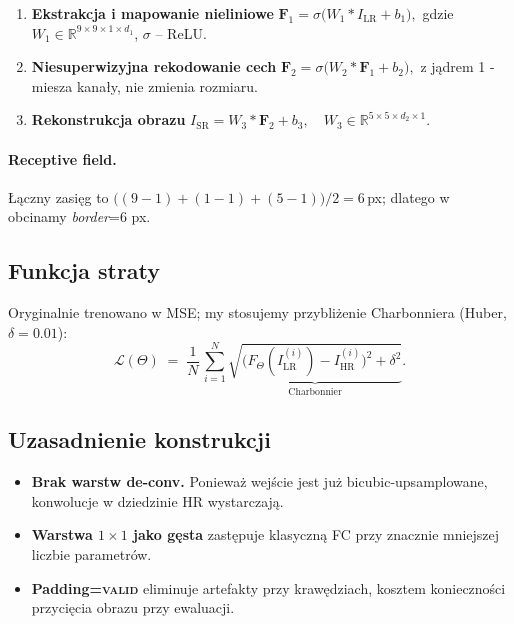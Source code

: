 \documentclass[11pt]{article}
\begin{document}
\begin{enumerate}
  \item \textbf{Ekstrakcja i mapowanie nieliniowe}  
        \(\displaystyle
          \mathbf{F}_1 = \sigma\!\bigl(W_1 * I_\mathrm{LR} + b_1\bigr),
        \)
        gdzie $W_1\in\mathbb R^{9\times9\times1\times d_1}$,
        $\sigma$ – ReLU.
  \item \textbf{Niesuperwizyjna rekodowanie cech}  
        \(\displaystyle
          \mathbf{F}_2 = \sigma\!\bigl(W_2 * \mathbf{F}_1 + b_2\bigr),
        \)
        z jądrem 1 - miesza kanały, nie zmienia rozmiaru.
  \item \textbf{Rekonstrukcja obrazu}  
        \(\displaystyle
          I_\mathrm{SR} = W_3 * \mathbf{F}_2 + b_3, \quad
          W_3\in\mathbb R^{5\times5\times d_2\times1}.
        \)
\end{enumerate}


\paragraph{Receptive field.}
Łączny zasięg to
\(\bigl((9-1) + (1-1) + (5-1)\bigr)/2 = 6\)\,px; dlatego w
obcinamy \emph{border}=\num{6} px.

\subsection{Funkcja straty}

Oryginalnie trenowano w MSE; my stosujemy przybliżenie Charbonniera
(Huber, $\delta=0.01$):
\begin{equation}
  \mathcal L(\Theta) \;=\;
  \frac1{N} \,\sum_{i=1}^{N} 
    \underbrace{\sqrt{ \bigl(F_\Theta(I_\mathrm{LR}^{(i)}) -
                              I_\mathrm{HR}^{(i)}\bigr)^{2} + \delta^{2}}}
                _{\text{Charbonnier}}\!.
\end{equation}

\subsection{Uzasadnienie konstrukcji}

\begin{itemize}
  \item \textbf{Brak warstw de-conv.}  Ponieważ wejście jest już
        bicubic-up­samp­lo­wa­ne, konwolucje w dziedzinie HR wystarczają.
  \item \textbf{Warstwa $1\times1$ jako gęsta} zastępuje klasyczną FC
        przy znacznie mniejszej liczbie parametrów.
  \item \textbf{Padding=\textsc{valid}} eliminuje artefakty przy krawędziach,
        kosztem konieczności przycięcia obrazu przy ewaluacji.
\end{itemize}
\end{document}
